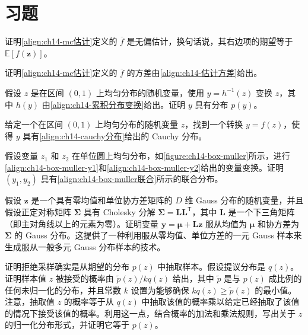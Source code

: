 \documentclass[../../main.tex]{subfiles}
\begin{document}
\section{习题}\label{section:ch14-习题}

\begin{exercise}[$\star\star$]\label{exercise:ch14-01}
证明\eqref{align:ch14-mc估计}定义的 $\overline{f}$ 是无偏估计，换句话说，其右边项的期望等于 $\mathbb{E}[f(\bm{z})]$。
\end{exercise}

\begin{exercise}[$\star$]\label{exercise:ch14-02}
证明\eqref{align:ch14-mc估计}定义的 $\overline{f}$ 的方差由\eqref{align:ch14-估计方差}给出。
\end{exercise}

\begin{exercise}[$\star$]\label{exercise:ch14-03}
假设 $z$ 是在区间 $(0,1)$ 上均匀分布的随机变量，使用 $y=h^{-1}(z)$ 变换 $z$，其中 $h(y)$ 由\eqref{align:ch14-累积分布变换}给出。证明 $y$ 具有分布 $p(y)$。
\end{exercise}

\begin{exercise}[$\star\star$]\label{exercise:ch14-04}
给定一个在区间 $(0,1)$ 上均匀分布的随机变量 $z$，找到一个转换 $y=f(z)$，使得 $y$ 具有\eqref{align:ch14-cauchy分布}给出的 Cauchy 分布。
\end{exercise}

\begin{exercise}[$\star\star$]\label{exercise:ch14-05}
假设变量 $z_{1}$ 和 $z_{2}$ 在单位圆上均匀分布，如\cref{figure:ch14-box-muller}所示，进行\eqref{align:ch14-box-muller-y1}和\eqref{align:ch14-box-muller-y2}给出的变量变换。证明 $\left(y_{1},y_{2}\right)$ 具有\eqref{align:ch14-box-muller联合}所示的联合分布。
\end{exercise}

\begin{exercise}[$\star\star$]\label{exercise:ch14-06}
假设 $\bm{z}$ 是一个具有零均值和单位协方差矩阵的 $D$ 维 Gauss 分布的随机变量，并且假设正定对称矩阵 $\bm{\Sigma}$ 具有 Cholesky 分解 $\bm{\Sigma}=\bm{L}\bm{L}^{\mathsf{T}}$，其中 $\bm{L}$ 是一个下三角矩阵（即主对角线以上的元素为零）。证明变量 $\bm{y}=\bm{\mu}+\bm{L}\bm{z}$ 服从均值为 $\bm{\mu}$ 和协方差为 $\bm{\Sigma}$ 的 Gauss 分布。这提供了一种利用服从零均值、单位方差的一元 Gauss 样本来生成服从一般多元 Gauss 分布样本的技术。
\end{exercise}

\begin{exercise}[$\star\star$]\label{exercise:ch14-07}
证明拒绝采样确实是从期望的分布 $p(z)$ 中抽取样本。假设提议分布是 $q(z)$。证明样本值 $z$ 被接受的概率由 $\widetilde{p}(z)/kq(z)$ 给出，其中 $\widetilde{p}$ 是与 $p(z)$ 成比例的任何未归一化的分布，并且常数 $k$ 设置为能够确保 $kq(z)\geqslant\widetilde{p}(z)$ 的最小值。注意，抽取值 $z$ 的概率等于从 $q(z)$ 中抽取该值的概率乘以给定已经抽取了该值的情况下接受该值的概率。利用这一点，结合概率的加法和乘法规则，写出关于 $z$ 的归一化分布形式，并证明它等于 $p(z)$。
\end{exercise}
\end{document}
